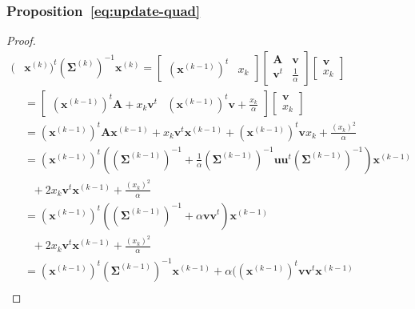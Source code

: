 \documentclass[journal,peerreview,onecolumn]{IEEEtran}
\begin{document}
    \subsubsection{Proposition~\ref{eq:update-quad}}
        \begin{proof}
            \begin{align*}
                (&\mathbf{x}^{(k)})^t (\boldsymbol{\Sigma}^{(k)})^{-1} \mathbf{x}^{(k)}
                = \left[\begin{array}{cc} (\mathbf{x}^{(k-1)})^t   & x_k \end{array}\right]
                \left[\begin{array}{cc}
                \mathbf{A}   & \mathbf{v} \\
                \mathbf{v}^t & \frac{1}{\alpha}
                \end{array}\right]
                \left[\begin{array}{c} \mathbf{v} \\ x_k \end{array}\right] \\
                &= \left[\begin{array}{cc} (\mathbf{x}^{(k-1)})^t \mathbf{A} + x_k \mathbf{v}^t & (\mathbf{x}^{(k-1)})^t \mathbf{v} + \frac{x_k}{\alpha} \end{array}\right]
                \left[\begin{array}{c} \mathbf{v} \\ x_k \end{array}\right] \\
                &= (\mathbf{x}^{(k-1)})^t \mathbf{A} \mathbf{x}^{(k-1)} + x_k \mathbf{v}^t \mathbf{x}^{(k-1)} + (\mathbf{x}^{(k-1)})^t \mathbf{v} x_k + \frac{(x_k)^2}{\alpha} \\
                &= (\mathbf{x}^{(k-1)})^t ((\boldsymbol{\Sigma}^{(k-1)})^{-1} + \frac{1}{\alpha} (\boldsymbol{\Sigma}^{(k-1)})^{-1} \mathbf{u} \mathbf{u}^t (\boldsymbol{\Sigma}^{(k-1)})^{-1}) \mathbf{x}^{(k-1)}\\
                &~~~+ 2 x_k \mathbf{v}^t \mathbf{x}^{(k-1)} + \frac{(x_k)^2}{\alpha} \\
                &= (\mathbf{x}^{(k-1)})^t ((\boldsymbol{\Sigma}^{(k-1)})^{-1} + \alpha \mathbf{v} \mathbf{v}^t) \mathbf{x}^{(k-1)}\\
                &~~~+ 2 x_k \mathbf{v}^t \mathbf{x}^{(k-1)} + \frac{(x_k)^2}{\alpha} \\
                &= (\mathbf{x}^{(k-1)})^t (\boldsymbol{\Sigma}^{(k-1)})^{-1} \mathbf{x}^{(k-1)} + \alpha ( (\mathbf{x}^{(k-1)})^t \mathbf{v} \mathbf{v}^t \mathbf{x}^{(k-1)} \\

\end{align*}
\end{proof}
\end{document}
